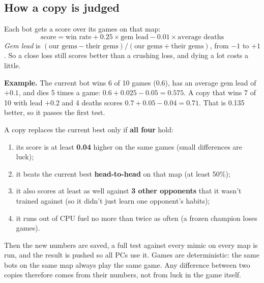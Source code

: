 \documentclass[11pt,a4paper]{article}
\begin{document}
\subsection*{How a copy is judged}
Each bot gets a score over its games on that map:
\[ \text{score} = \text{win rate} + 0.25 \times \text{gem lead} - 0.01 \times \text{average deaths} \]
\emph{Gem lead} is $(\text{our gems} - \text{their gems}) / (\text{our gems} + \text{their gems})$, from $-1$ to $+1$. So a close
loss still scores better than a crushing loss, and dying a lot costs a little.

\textbf{Example.} The current bot wins 6 of 10 games (0.6), has an average gem lead of $+0.1$, and dies 5 times a game:
$0.6 + 0.025 - 0.05 = 0.575$. A copy that wins 7 of 10 with lead $+0.2$ and 4 deaths scores
$0.7 + 0.05 - 0.04 = 0.71$. That is 0.135 better, so it passes the first test.

A copy replaces the current best only if \textbf{all four} hold:
\begin{enumerate}
\item[(a)] its score is at least \textbf{0.04} higher on the same games (small differences are luck);
\item[(b)] it beats the current best \textbf{head-to-head} on that map (at least 50\%);
\item[(c)] it also scores at least as well against \textbf{3 other opponents} that it wasn't trained against
  (so it didn't just learn one opponent's habits);
\item[(d)] it runs out of CPU fuel no more than twice as often (a frozen champion loses games).
\end{enumerate}
Then the new numbers are saved, a full test against every mimic on every map is run, and the result
is pushed so all PCs use it. Games are deterministic: the same bots on the same map always play the
same game. Any difference between two copies therefore comes from their numbers, not from luck in the
game itself.
\end{document}
